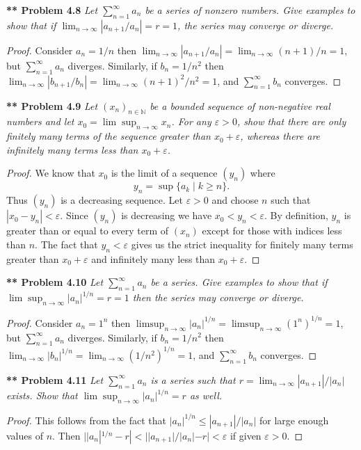 \documentclass{article}
\begin{document}
\begin{flushleft}
\textbf{** Problem 4.8}
\textit{Let $\sum_{n=1}^{\infty} a_n$ be a series of nonzero numbers. Give examples to show that if $\lim_{n \rightarrow \infty} |a_{n+1}/a_n| = r = 1$, the series may converge or diverge.}
\begin{proof}
Consider $a_n = 1/n$ then $\lim_{n \rightarrow \infty} |a_{n+1}/a_n| = \lim_{n \rightarrow \infty} (n+1)/n = 1$, but $\sum_{n=1}^{\infty} a_n$ diverges. Similarly, if $b_n = 1/n^2$ then $\lim_{n \rightarrow \infty} |b_{n+1}/b_n| = \lim_{n \rightarrow \infty} (n+1)^2/n^2 = 1$, and $\sum_{n=1}^{\infty} b_n$ converges.
\end{proof}

\textbf{** Problem 4.9}
\textit{Let $(x_n)_{n \in \mathbb{N}}$ be a bounded sequence of non-negative real numbers and let $x_0 = \lim \sup_{n \rightarrow \infty} x_n$. For any $\varepsilon > 0$, show that there are only finitely many terms of the sequence greater than $x_0 + \varepsilon$, whereas there are infinitely many terms less than $x_0 + \varepsilon$.}
\begin{proof}
We know that $x_0$ is the limit of a sequence $(y_n)$ where
\[
y_n = \sup \{a_k \mid k \geq n\}.
\]
Thus $(y_n)$ is a decreasing sequence. Let $\varepsilon > 0$ and choose $n$ such that $|x_0 - y_n| < \varepsilon$. Since $(y_n)$ is decreasing we have $x_0 < y_n < \varepsilon$. By definition, $y_n$ is greater than or equal to every term of $(x_n)$ except for those with indices less than $n$. The fact that $y_n < \varepsilon$ gives us the strict inequality for finitely many terms greater than $x_0 + \varepsilon$ and infinitely many less than $x_0 + \varepsilon$.
\end{proof}

\textbf{** Problem 4.10}
\textit{Let $\sum_{n=1}^{\infty} a_n$ be a series. Give examples to show that if $\lim \sup_{n \rightarrow \infty} |a_n|^{1/n} = r = 1$ then the series may converge or diverge.}
\begin{proof}
Consider $a_n = 1^n$ then $\limsup_{n \rightarrow \infty} |a_n|^{1/n} = \limsup_{n \rightarrow \infty} (1^n)^{1/n} = 1$, but $\sum_{n=1}^{\infty} a_n$ diverges. Similarly, if $b_n = 1/n^2$ then $\lim_{n \rightarrow \infty} |b_n|^{1/n} = \lim_{n \rightarrow \infty} (1/n^2)^{1/n} = 1$, and $\sum_{n=1}^{\infty} b_n$ converges.
\end{proof}

\textbf{** Problem 4.11}
\textit{Let $\sum_{n=1}^{\infty} a_n$ is a series such that $r=\lim_{n \rightarrow \infty} |a_{n+1}|/|a_n|$ exists. Show that $\lim \sup_{n \rightarrow \infty} |a_n|^{1/n} = r$ as well.}
\begin{proof}
This follows from the fact that $|a_n|^{1/n} \leq |a_{n+1}|/|a_n|$ for large enough values of $n$. Then $||a_n|^{1/n} - r| < ||a_{n+1}|/|a_n| - r| < \varepsilon$ if given $\varepsilon > 0$.
\end{proof}


\end{flushleft}
\end{document}
